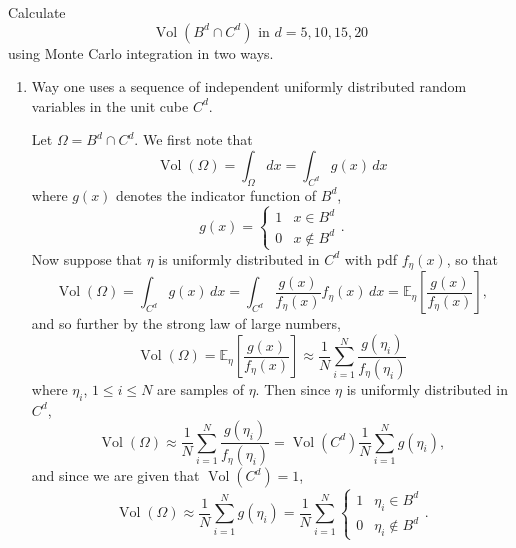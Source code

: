 \documentclass{../kin_math}
\begin{document}
\begin{questions}
  Calculate
  \begin{equation}
    \operatorname{Vol}\left(B^d \cap C^d\right) \text{ in } d = 5, 10, 15, 20
  \end{equation}
  using Monte Carlo integration in two ways.
  \begin{enumerate}[label=\arabic*.]
    \item Way one uses a sequence of independent uniformly distributed random variables in the unit cube $C^d$.
    \begin{solution}
      Let $\Omega = B^d \cap C^d$. We first note that
      \begin{equation*}
        \operatorname{Vol}(\Omega) = \int_\Omega dx = \int_{C^d} g(x) \, dx
      \end{equation*}
      where $g(x)$ denotes the indicator function of $B^d$,
      \begin{equation*}
        g(x) = \begin{cases} 1 & x \in B^d \\ 0 & x \notin B^d \end{cases}.
      \end{equation*}
      Now suppose that $\eta$ is uniformly distributed in $C^d$ with pdf $f_\eta(x)$, so that
      \begin{equation*}
        \operatorname{Vol}(\Omega) = \int_{C^d} g(x) \, dx = \int_{C^d} \frac{g(x)}{f_\eta(x)} f_\eta(x) \, dx = \mathbb{E}_\eta \left[\frac{g(x)}{f_\eta(x)}\right],
      \end{equation*}
      and so further by the strong law of large numbers,
      \begin{equation*}
        \operatorname{Vol}(\Omega) = \mathbb{E}_\eta \left[\frac{g(x)}{f_\eta(x)}\right] \approx \frac{1}{N} \sum_{i = 1}^N \frac{g(\eta_i)}{f_\eta(\eta_i)}
      \end{equation*}
      where $\eta_i$, $1 \leq i \leq N$ are samples of $\eta$. Then since $\eta$ is uniformly distributed in $C^d$,
      \begin{equation*}
        \operatorname{Vol}(\Omega) \approx \frac{1}{N} \sum_{i = 1}^N \frac{g(\eta_i)}{f_\eta(\eta_i)} = \operatorname{Vol}(C^d) \frac{1}{N} \sum_{i = 1}^N g(\eta_i),
      \end{equation*}
      and since we are given that $\operatorname{Vol}(C^d) = 1$,
      \begin{equation*}
        \operatorname{Vol}(\Omega) \approx \frac{1}{N} \sum_{i = 1}^N g(\eta_i) = \frac{1}{N} \sum_{i = 1}^N \begin{cases} 1 & \eta_i \in B^d \\ 0 & \eta_i \notin B^d \end{cases}.

\end{equation*}
\end{solution}
\end{enumerate}
\end{questions}
\end{document}
